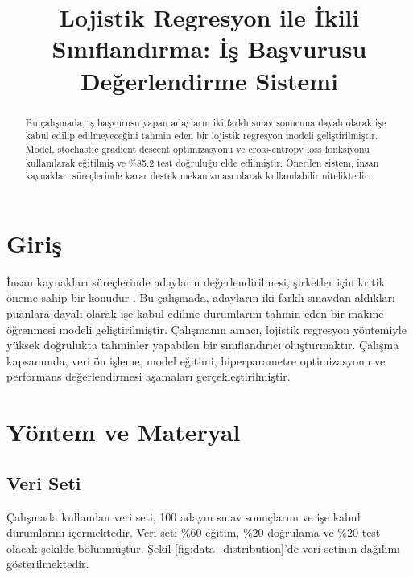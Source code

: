 \documentclass[conference]{IEEEtran}
\begin{document}
\title{Lojistik Regresyon ile İkili Sınıflandırma: İş Başvurusu Değerlendirme Sistemi}

\author{
}

\maketitle

\begin{abstract}
Bu çalışmada, iş başvurusu yapan adayların iki farklı sınav sonucuna dayalı
olarak işe kabul edilip edilmeyeceğini tahmin eden bir lojistik regresyon
modeli geliştirilmiştir. Model, stochastic gradient descent optimizasyonu ve
cross-entropy loss fonksiyonu kullanılarak eğitilmiş ve \%85.2 test doğruluğu
elde edilmiştir. Önerilen sistem, insan kaynakları süreçlerinde karar destek
mekanizması olarak kullanılabilir niteliktedir.
\end{abstract}


\section{Giriş}
İnsan kaynakları süreçlerinde adayların değerlendirilmesi, şirketler için
kritik öneme sahip bir konudur \cite{smith2023}. Bu çalışmada, adayların iki
farklı sınavdan aldıkları puanlara dayalı olarak işe kabul edilme durumlarını
tahmin eden bir makine öğrenmesi modeli geliştirilmiştir. Çalışmanın amacı,
lojistik regresyon yöntemiyle yüksek doğrulukta tahminler yapabilen bir
sınıflandırıcı oluşturmaktır. Çalışma kapsamında, veri ön işleme, model
eğitimi, hiperparametre optimizasyonu ve performans değerlendirmesi aşamaları
gerçekleştirilmiştir.

\section{Yöntem ve Materyal}

\subsection{Veri Seti}
Çalışmada kullanılan veri seti, 100 adayın sınav sonuçlarını ve işe kabul
durumlarını içermektedir. Veri seti \%60 eğitim, \%20 doğrulama ve \%20 test
olacak şekilde bölünmüştür. Şekil \ref{fig:data_distribution}'de veri setinin
dağılımı gösterilmektedir.
\end{document}
